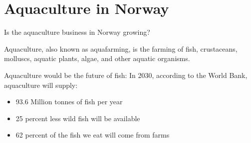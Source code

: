 \newpage

\section{Aquaculture in Norway}

Is the aquaculture business in Norway growing? 
  
Aquaculture, also known as aquafarming, is the farming of fish, crustaceans, molluscs, aquatic plants, algae, and other aquatic organisms.

Aquaculture would be the future of fish:
In 2030, according to the World Bank, aquaculture will supply:
\begin{itemize}
\item 93.6 Million tonnes of fish per year
\item 25 percent less wild fish will be available
\item 62 percent of the fish we eat will come from farms
\end{itemize}




